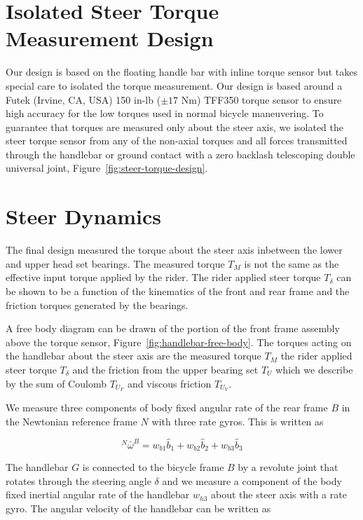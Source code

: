 \documentclass[10pt]{article}
\begin{document}
\section*{Isolated Steer Torque Measurement Design}

Our design is based on the floating handle bar with inline torque sensor but
takes special care to isolated the torque measurement. Our design is based
around a Futek (Irvine, CA, USA) 150 in-lb ($\pm 17$ Nm) TFF350 torque sensor
to ensure high accuracy for the low torques used in normal bicycle maneuvering.
To guarantee that torques are measured only about the steer axis, we isolated
the steer torque sensor from any of the non-axial torques and all forces
transmitted through the handlebar or ground contact with a zero backlash
telescoping double universal joint, Figure~\ref{fig:steer-torque-design}.


\section*{Steer Dynamics}
\label{sec:steer-dynamics}

The final design measured the torque about the steer axis inbetween the lower
and upper head set bearings. The measured torque $T_M$ is not the same as the
effective input torque applied by the rider. The rider applied steer torque
$T_\delta$ can be shown to be a function of the kinematics of the front and
rear frame and the friction torques generated by the bearings.

A free body diagram can be drawn of the portion of the front frame assembly
above the torque sensor, Figure~\ref{fig:handlebar-free-body}. The torques
acting on the handlebar about the steer axis are the measured torque $T_M$ the
rider applied steer torque $T_\delta$ and the friction from the upper bearing
set $T_U$ which we describe by the sum of Coulomb $T_{U_F}$ and viscous
friction $T_{U_V}$.

We measure three components of body fixed angular rate of the rear frame $B$ in
the Newtonian reference frame $N$ with three rate gyros. This is written as

\begin{equation}
  ^N\bar{\omega}^B = w_{b1}\hat{b}_1 + w_{b2}\hat{b}_2 +
  w_{b3}\hat{b}_3
  \label{eq:rear-frame-angular-rate}
\end{equation}

The handlebar $G$ is connected to the bicycle frame $B$ by a revolute joint
that rotates through the steering angle $\delta$ and we measure a component of
the body fixed inertial angular rate of the handlebar $w_{h3}$ about the steer
axis with a rate gyro. The angular velocity of the handlebar can be written as
\end{document}
